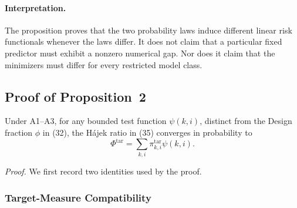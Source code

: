 \paragraph{Interpretation.}
The proposition proves that the two probability laws induce different linear
risk functionals whenever the laws differ.  It does not claim that a particular
fixed predictor must exhibit a nonzero numerical gap.  Nor does it claim that
the minimizers must differ for every restricted model class.


\subsection{Proof of Proposition~2}
\label{app:proof_prop2}

\begin{proposition*}
Under A1--A3, for any bounded test function $\psi(k,i)$, distinct from
the Design fraction $\phi$ in (32), the H\'ajek ratio in
(35) converges in probability to
\begin{equation}
    \Phi^{\mathrm{tar}}
    =
    \sum_{k,i}
    \pi^{\mathrm{tar}}_{k,i}\psi(k,i).
    \label{eq:app_target_phi}
\end{equation}
\end{proposition*}

\noindent\emph{Proof.}
We first record two identities used by the proof.

\subsubsection{Target-Measure Compatibility}

